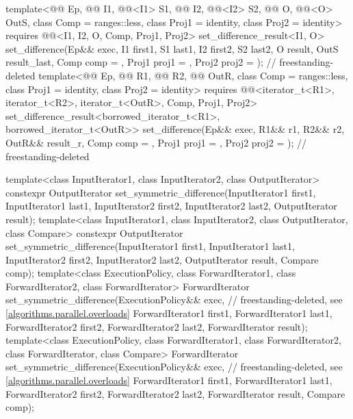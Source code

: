 \begin{codeblock}
{{    template<@@ Ep, @@ I1, @@<I1> S1,
             @@ I2, @@<I2> S2,
             @@ O, @@<O> OutS, class Comp = ranges::less,
             class Proj1 = identity, class Proj2 = identity>
      requires @@<I1, I2, O, Comp, Proj1, Proj2>
      set_difference_result<I1, O>
        set_difference(Ep&& exec, I1 first1, S1 last1, I2 first2, S2 last2,
                       O result, OutS result_last, Comp comp = {}, Proj1 proj1 = {},
                       Proj2 proj2 = {});                       // freestanding-deleted
    template<@@ Ep, @@ R1, @@ R2,
             @@ OutR, class Comp = ranges::less,
             class Proj1 = identity, class Proj2 = identity>
      requires @@<iterator_t<R1>, iterator_t<R2>, iterator_t<OutR>, Comp, Proj1, Proj2>
      set_difference_result<borrowed_iterator_t<R1>, borrowed_iterator_t<OutR>>
        set_difference(Ep&& exec, R1&& r1, R2&& r2, OutR&& result_r, Comp comp = {},
                       Proj1 proj1 = {}, Proj2 proj2 = {});     // freestanding-deleted
  }

  template<class InputIterator1, class InputIterator2, class OutputIterator>
    constexpr OutputIterator
      set_symmetric_difference(InputIterator1 first1, InputIterator1 last1,
                               InputIterator2 first2, InputIterator2 last2,
                               OutputIterator result);
  template<class InputIterator1, class InputIterator2, class OutputIterator, class Compare>
    constexpr OutputIterator
      set_symmetric_difference(InputIterator1 first1, InputIterator1 last1,
                               InputIterator2 first2, InputIterator2 last2,
                               OutputIterator result, Compare comp);
  template<class ExecutionPolicy, class ForwardIterator1, class ForwardIterator2,
           class ForwardIterator>
    ForwardIterator
      set_symmetric_difference(ExecutionPolicy&& exec,          // freestanding-deleted, see \ref{algorithms.parallel.overloads}
                               ForwardIterator1 first1, ForwardIterator1 last1,
                               ForwardIterator2 first2, ForwardIterator2 last2,
                               ForwardIterator result);
  template<class ExecutionPolicy, class ForwardIterator1, class ForwardIterator2,
           class ForwardIterator, class Compare>
    ForwardIterator
      set_symmetric_difference(ExecutionPolicy&& exec,          // freestanding-deleted, see \ref{algorithms.parallel.overloads}
                               ForwardIterator1 first1, ForwardIterator1 last1,
                               ForwardIterator2 first2, ForwardIterator2 last2,
                               ForwardIterator result, Compare comp);

}
\end{codeblock}

